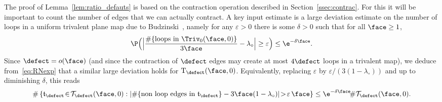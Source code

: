 The proof of Lemma~\ref{lem:ratio_defauts} is based on the contraction operation described in Section~\ref{ssec:contrac}.
For this it will be important to count the number of edges that we can actually contract. A key input estimate is a large deviation estimate on the number of loops in a uniform trivalent plane map due to Budzinski~\cite[Th.\,2]{Bud21}, namely for any $ \varepsilon>0$ there is some $\delta>0$ such that for all $ \face \geq 1$,
\[
\P\Bigl(\Bigl| \frac{\#\{\text{loops in } \Triv_0(\face, 0)\}}{3 \face} - \lambda_{\circ}\Bigr| \geq \varepsilon \Bigr) \leq \e^{-\delta \face}.
\]
Since $ \defect=o(\face)$ (and since the contraction of $ \defect$ edges may create at most $4 \defect$ loops in a trivalent map), we deduce from~\eqref{eq:RNexp} that a similar large deviation holds for $\mathrm{T}_\defect(\face,0)$.
Equivalently, replacing $\varepsilon$ by $\varepsilon/(3(1-\lambda_{\circ}))$ and up to diminishing $ \delta$, this reads
\begin{equation}\label{eq:grande_dev_loops}
\#\left\{\mathfrak{t}_{\defect} \!\in\! \mathcal{T}_\defect(\face, 0) : \left|\#\{\text{non loop edges in } \mathfrak{t}_\defect\} - 3\face(1-\lambda_{\circ})\right| \!>\! \varepsilon\, \face \right\} \le \e^{-\delta \face}\! \# \mathcal{T}_\defect(\face, 0).
\end{equation}

